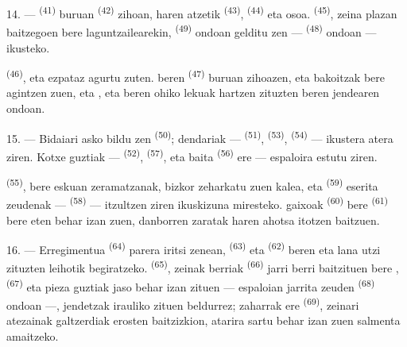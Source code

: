 \VUsaut{3.0mm}

14. ---  \textsuperscript{(41)} buruan
 \textsuperscript{(42)} zihoan, haren atzetik
 \textsuperscript{(43)}, 
\textsuperscript{(44)} eta  osoa. 
\textsuperscript{(45)}, zeina plazan baitzegoen bere laguntzailearekin,
 \textsuperscript{(49)} ondoan gelditu zen ---
 \textsuperscript{(48)} ondoan --- 
ikusteko.

 \textsuperscript{(46)},
 eta  ezpataz agurtu zuten.
 beren  \textsuperscript{(47)} buruan
zihoazen, eta  bakoitzak bere  agintzen zuen,
eta ,  eta  beren ohiko
lekuak hartzen zituzten beren jendearen ondoan.

15. --- Bidaiari asko bildu zen  \textsuperscript{(50)};
dendariak ---  \textsuperscript{(51)},
 \textsuperscript{(53)}, 
\textsuperscript{(54)} ---  ikustera atera ziren. Kotxe guztiak
---  \textsuperscript{(52)},  \textsuperscript{(57)}, eta baita 
\textsuperscript{(56)} ere --- espaloira estutu ziren.

\VUsaut{3.0mm}

 \textsuperscript{(55)}, bere 
eskuan zeramatzanak, bizkor zeharkatu zuen kalea, eta 
\textsuperscript{(59)} eserita zeudenak --- 
\textsuperscript{(58)} --- itzultzen ziren ikuskizuna miresteko. 
gaixoak \textsuperscript{(60)} bere 
\textsuperscript{(61)} bere  eten behar izan zuen, danborren
zaratak haren ahotsa itotzen baitzuen.

16. --- Erregimentua  \textsuperscript{(64)} parera iritsi
zenean,  \textsuperscript{(63)} eta 
\textsuperscript{(62)} beren  eta lana utzi zituzten
leihotik begiratzeko.  \textsuperscript{(65)}, zeinak
 berriak \textsuperscript{(66)} jarri berri baitzituen bere
,  \textsuperscript{(67)} eta
 pieza guztiak jaso behar izan zituen --- espaloian jarrita
zeuden  \textsuperscript{(68)} ondoan ---, jendetzak
irauliko zituen beldurrez;  zaharrak ere
\textsuperscript{(69)}, zeinari atezainak galtzerdiak erosten baitzizkion, atarira
sartu behar izan zuen salmenta amaitzeko.

